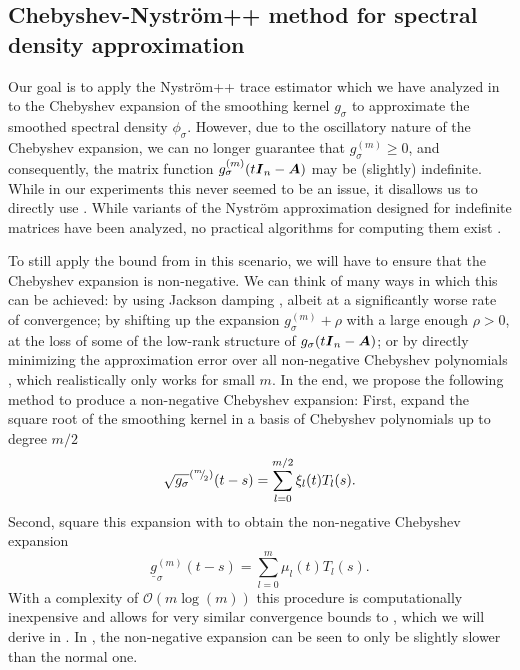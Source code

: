 \documentclass[12pt]{article}
\begin{document}
\subsection{Chebyshev-Nyström++ method for spectral density approximation}
\label{subsec:chebyshev-nystrom}

Our goal is to apply the Nyström++ trace estimator which we have analyzed in  to the Chebyshev expansion of the smoothing kernel $g_{\sigma}$ to approximate the smoothed spectral density $\phi_{\sigma}$. However, due to the oscillatory nature of the Chebyshev expansion, we can no longer guarantee that $g_{\sigma}^{(m)} \geq 0$, and consequently, the matrix function $g_{\sigma}^{(m)}(t \boldsymbol{I}_n - \boldsymbol{A})$ may be (slightly) indefinite. While in our experiments this never seemed to be an issue, it disallows us to directly use . While variants of the Nyström approximation designed for indefinite matrices have been analyzed, no practical algorithms for computing them exist \cite{nakatsukasa-2023-randomized-lowrank}.

To still apply the bound from  in this scenario, we will have to ensure that the Chebyshev expansion is non-negative. We can think of many ways in which this can be achieved: by using Jackson damping \cite{jackson-1912-approximation-trigonometric,braverman-2022-sublinear-time}, albeit at a significantly worse rate of convergence; by shifting up the expansion $g_{\sigma}^{(m)} + \rho$ with a large enough $\rho > 0$, at the loss of some of the low-rank structure of $g_{\sigma}(t \boldsymbol{I}_n - \boldsymbol{A})$; or by directly minimizing the approximation error over all non-negative Chebyshev polynomials \cite{fejer-1916-uber-trigonometrische}, which realistically only works for small $m$. In the end, we propose the following method to produce a non-negative Chebyshev expansion: First, expand the square root of the smoothing kernel in a basis of Chebyshev polynomials up to degree $m/2$
\begin{equation}
    \sqrt{g_{\sigma}}^{({}^{m}{\mskip -5mu/\mskip -3mu}_{2})}(t - s) = \sum_{l=0}^{m/2} \xi_l(t) T_l(s).
\end{equation}
Second, square this expansion with  to obtain the non-negative Chebyshev expansion
\begin{equation}
    \underline{g}^{(m)}_{\sigma}(t - s) = \sum_{l=0}^{m} \mu_l(t) T_l(s).
    \label{equ:non-negative-chebyshev-expansion}
\end{equation}
With a complexity of $\mathcal{O}(m \log(m))$ this procedure is computationally inexpensive and allows for very similar convergence bounds to , which we will derive in . In , the non-negative expansion can be seen to only be slightly slower than the normal one.
\end{document}
